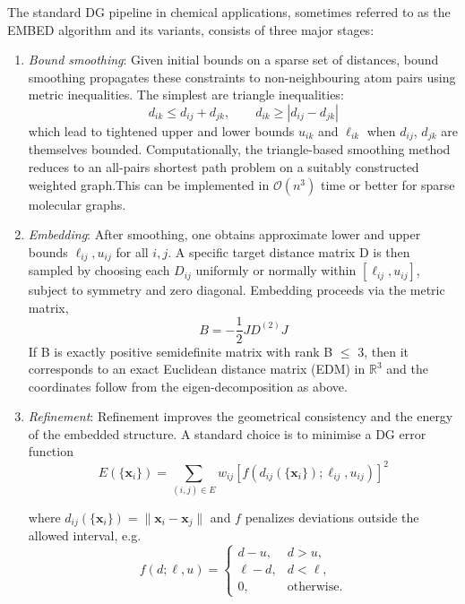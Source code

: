 \documentclass[12pt]{article}
\begin{document}
The standard DG pipeline in chemical applications, sometimes referred to as the EMBED algorithm and its variants\cite{CH2_havel_kuntz_crippen_1983,CH2_havel_dg_review_1998,CH2_spellmeyer_dg_conf_1997}, consists of three major stages:
\begin{enumerate}
\item \textit{Bound smoothing}: Given initial bounds on a sparse set of distances, bound smoothing propagates these constraints to non-neighbouring atom pairs using metric inequalities.
The simplest are triangle inequalities:
\begin{equation}
    d_{ik} \le d_{ij} + d_{jk}, \qquad
    d_{ik} \ge |d_{ij} - d_{jk}|
\label{eq:Bound_smoothing}
\end{equation}
which lead to tightened upper and lower bounds $u_{ik}$ and $\ell_{ik}$ when $d_{ij}$, $d_{jk}$ are themselves bounded. Computationally, the triangle-based smoothing method reduces to an all-pairs shortest path problem on a suitably constructed weighted graph.This can be implemented in $\mathcal{O}(n^3)$ time or better for sparse molecular graphs\cite{CH2_havel_kuntz_crippen_1983,CH2_havel_dg_review_1998}.

\item \textit{Embedding}: After smoothing, one obtains approximate lower and upper bounds $\ell_{ij},u_{ij}$ for all $i,j$. A specific target distance matrix D is then sampled by choosing each $D_{ij}$ uniformly or normally within $[\ell_{ij},u_{ij}]$, subject to symmetry and zero diagonal. Embedding proceeds via the metric matrix,
\begin{equation}
    B = -\frac{1}{2} J D^{(2)} J
  \label{eq:DG_embedd}
\end{equation}
If B is exactly positive semidefinite matrix with rank B $\le$ 3, then it corresponds to an exact Euclidean distance matrix (EDM) in $\mathbb{R}^3$ and the coordinates follow from the eigen-decomposition as above.

\item \textit{Refinement}: Refinement improves the geometrical consistency and the energy of the embedded structure.
A standard choice is to minimise a DG error function
\begin{equation}
 E(\{\bm{x}_i\}) =
 \sum_{(i,j)\in E} w_{ij}
 \left[
  f(d_{ij}(\{\bm{x}_i\}); \ell_{ij}, u_{ij})
 \right]^2
   \label{eq:DG_refine1}
\end{equation}

where $d_{ij}(\{\bm{x}_i\}) = \|\bm{x}_i - \bm{x}_j\|$ and $f$ penalizes deviations outside the allowed interval, e.g.
\begin{equation}
 f(d;\ell,u) =
 \begin{cases}
  d - u, & d > u,\\
  \ell - d, & d < \ell,\\
  0, & \text{otherwise}.
 \end{cases}
   \label{eq:refine2}
\end{equation}


\end{enumerate}
\end{document}
